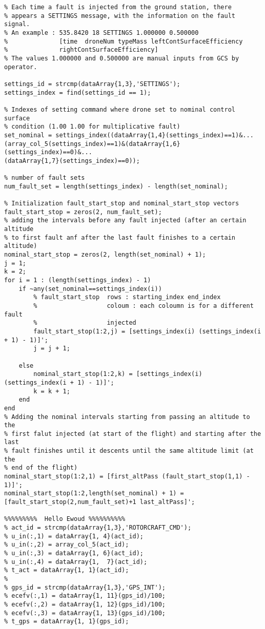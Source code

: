 \begin{lstlisting}
% Each time a fault is injected from the ground station, there
% appears a SETTINGS message, with the information on the fault signal.
% An example : 535.8420 18 SETTINGS 1.000000 0.500000
%              [time  droneNum typeMass leftContSurfaceEfficiency
%              rightContSurfaceEfficiency]
% The values 1.000000 and 0.500000 are manual inputs from GCS by operator.

settings_id = strcmp(dataArray{1,3},'SETTINGS');
settings_index = find(settings_id == 1);

% Indexes of setting command where drone set to nominal control surface
% condition (1.00 1.00 for multiplicative fault)
set_nominal = settings_index((dataArray{1,4}(settings_index)==1)&...
(array_col_5(settings_index)==1)&(dataArray{1,6}(settings_index)==0)&...
(dataArray{1,7}(settings_index)==0));

% number of fault sets 
num_fault_set = length(settings_index) - length(set_nominal);

% Initialization fault_start_stop and nominal_start_stop vectors
fault_start_stop = zeros(2, num_fault_set);
% adding the intervals before any fault injected (after an certain altitude
% to first fault anf after the last fault finishes to a certain altitude)
nominal_start_stop = zeros(2, length(set_nominal) + 1);
j = 1;
k = 2;
for i = 1 : (length(settings_index) - 1)
    if ~any(set_nominal==settings_index(i))
        % fault_start_stop  rows : starting_index end_index
        %                   coloum : each coloumn is for a different fault
        %                   injected
        fault_start_stop(1:2,j) = [settings_index(i) (settings_index(i + 1) - 1)]';
        j = j + 1;
        
    else
        nominal_start_stop(1:2,k) = [settings_index(i) (settings_index(i + 1) - 1)]';
        k = k + 1;
    end
end
% Adding the nominal intervals starting from passing an altitude to the
% first falut injected (at start of the flight) and starting after the last
% fault finishes until it descents until the same altitude limit (at the 
% end of the flight) 
nominal_start_stop(1:2,1) = [first_altPass (fault_start_stop(1,1) - 1)]';
nominal_start_stop(1:2,length(set_nominal) + 1) = [fault_start_stop(2,num_fault_set)+1 last_altPass]';

%%%%%%%%%  Hello Ewoud %%%%%%%%%%
% act_id = strcmp(dataArray{1,3},'ROTORCRAFT_CMD');
% u_in(:,1) = dataArray{1, 4}(act_id);
% u_in(:,2) = array_col_5(act_id);
% u_in(:,3) = dataArray{1, 6}(act_id);
% u_in(:,4) = dataArray{1,  7}(act_id);
% t_act = dataArray{1, 1}(act_id);
% 
% gps_id = strcmp(dataArray{1,3},'GPS_INT');
% ecefv(:,1) = dataArray{1, 11}(gps_id)/100;
% ecefv(:,2) = dataArray{1, 12}(gps_id)/100;
% ecefv(:,3) = dataArray{1, 13}(gps_id)/100;
% t_gps = dataArray{1, 1}(gps_id);
 \end{lstlisting}
 
